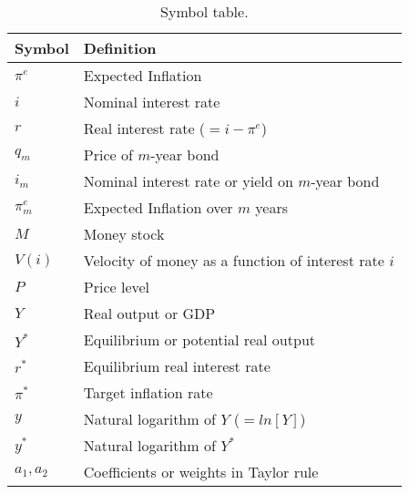 \begin{table}[H]
\centering
\caption{Symbol table.}
\begin{tabular*}{0.85\textwidth}{l@{\extracolsep{\fill}}l}
\toprule
Symbol & Definition\\
\midrule
$\pi^e$     &Expected Inflation\\
$i$                &Nominal interest rate\\
$r$                &Real interest rate ($= i- \pi^e$)\\
$q_m$             &Price of $m$-year bond  \\
$i_m$           &Nominal interest rate or yield
 on $m$-year bond \\
$\pi^e_m$       &Expected Inflation over $m$ years\\
$M$                &Money stock\\
$V(i)$             &Velocity of money as a function of interest rate $i$\\
$P$                &Price level\\
$Y$               &Real output or GDP\\
$Y^*$          &Equilibrium or potential real output\\
$r^*$          &Equilibrium real interest rate\\
$\pi^*$        &Target inflation rate\\
$y$               &Natural logarithm of $Y$ ($=ln[Y]$)\\
$y^*$          &Natural logarithm of $Y^*$\\
$a_1,a_2$      &Coefficients or weights in Taylor rule\\
\bottomrule
\end{tabular*}
\end{table}

